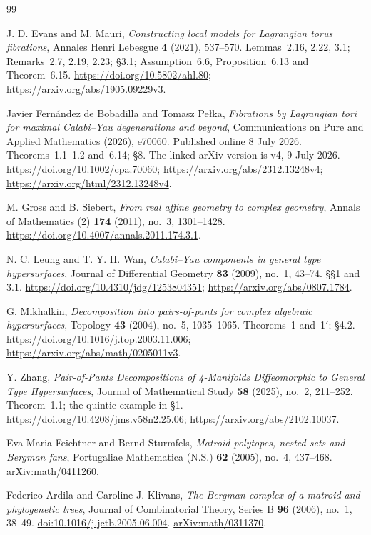 \begin{thebibliography}{99}

J. D. Evans and M. Mauri,
\emph{Constructing local models for Lagrangian torus fibrations},
Annales Henri Lebesgue \textbf{4} (2021), 537--570.
Lemmas~2.16, 2.22, 3.1; Remarks~2.7, 2.19, 2.23; \S3.1;
Assumption~6.6, Proposition~6.13 and Theorem~6.15.
\url{https://doi.org/10.5802/ahl.80};
\url{https://arxiv.org/abs/1905.09229v3}.

Javier Fern\'andez de Bobadilla and Tomasz Pe\l ka,
\emph{Fibrations by Lagrangian tori for maximal Calabi--Yau degenerations and beyond},
Communications on Pure and Applied Mathematics (2026), e70060.
Published online 8 July 2026.
Theorems~1.1--1.2 and~6.14; \S8.
The linked arXiv version is v4, 9 July 2026.
\url{https://doi.org/10.1002/cpa.70060};
\url{https://arxiv.org/abs/2312.13248v4};
\url{https://arxiv.org/html/2312.13248v4}.

M. Gross and B. Siebert,
\emph{From real affine geometry to complex geometry},
Annals of Mathematics (2) \textbf{174} (2011), no.~3, 1301--1428.
\url{https://doi.org/10.4007/annals.2011.174.3.1}.

N. C. Leung and T. Y. H. Wan,
\emph{Calabi--Yau components in general type hypersurfaces},
Journal of Differential Geometry \textbf{83} (2009), no.~1, 43--74.
\S\S1 and 3.1.
\url{https://doi.org/10.4310/jdg/1253804351};
\url{https://arxiv.org/abs/0807.1784}.

G. Mikhalkin,
\emph{Decomposition into pairs-of-pants for complex algebraic hypersurfaces},
Topology \textbf{43} (2004), no.~5, 1035--1065.
Theorems~1 and~1$'$; \S4.2.
\url{https://doi.org/10.1016/j.top.2003.11.006};
\url{https://arxiv.org/abs/math/0205011v3}.

Y. Zhang,
\emph{Pair-of-Pants Decompositions of 4-Manifolds Diffeomorphic to General Type Hypersurfaces},
Journal of Mathematical Study \textbf{58} (2025), no.~2, 211--252.
Theorem~1.1; the quintic example in \S1.
\url{https://doi.org/10.4208/jms.v58n2.25.06};
\url{https://arxiv.org/abs/2102.10037}.

Eva Maria Feichtner and Bernd Sturmfels,
\emph{Matroid polytopes, nested sets and Bergman fans},
Portugaliae Mathematica (N.S.) \textbf{62} (2005), no.~4, 437--468.
\href{https://arxiv.org/abs/math/0411260}{arXiv:math/0411260}.

Federico Ardila and Caroline J. Klivans,
\emph{The Bergman complex of a matroid and phylogenetic trees},
Journal of Combinatorial Theory, Series B \textbf{96} (2006), no.~1, 38--49.
\href{https://doi.org/10.1016/j.jctb.2005.06.004}{doi:10.1016/j.jctb.2005.06.004}.
\href{https://arxiv.org/abs/math/0311370}{arXiv:math/0311370}.


\end{thebibliography}

